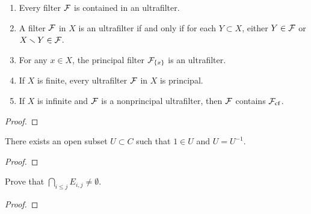 \begin{problem}
\begin{enumerate}[label=(\alph*)]
\item Every filter $\mathcal{F}$ is contained in an ultrafilter.
\item A filter $\mathcal{F}$ in $X$ is an ultrafilter if and only if for each
  $Y\subset X$, either $Y\in\mathcal{F}$ or $X\minus Y\in\calF$.
\item For any $x\in X$, the principal filter $\mathcal{F}_{\{x\}}$ is an
  ultrafilter.
\item If $X$ is finite, every ultrafilter $\mathcal{F}$ in $X$ is principal.
\item If $X$ is infinite and $\mathcal{F}$ is a nonprincipal ultrafilter, then
  $\mathcal{F}$ contains $\mathcal{F}_{\mathrm{cf}}$.
\end{enumerate}
\end{problem}
\begin{proof}
\end{proof}
\newpage

\begin{problem}
There exists an open subset $U\subset C$ such that $1\in U$ and
$U=U^{-1}$.
\end{problem}
\begin{proof}
\end{proof}
\newpage

\begin{problem}
Prove that $\bigcap_{i\leq j}E_{i,j}\neq\emptyset$.
\end{problem}
\begin{proof}
\end{proof}

